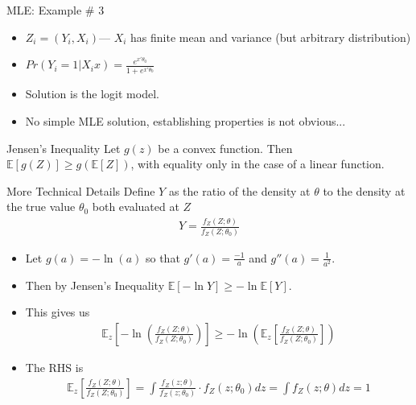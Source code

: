 \documentclass[aspectratio=169]{beamer}
\begin{document}
\begin{frame}{MLE: Example \# 3}
\begin{itemize}
\item $Z_i = (Y_i, X_i)$---   $X_i$ has finite mean and variance (but arbitrary distribution)
\item $Pr(Y_i=1 | X_i  x) =  \frac{e^{x' \theta_0}}{1+ e^{x'\theta_0}}$
\item Solution is the \alert{logit} model.
\item No simple MLE solution, establishing properties is not obvious...
\end{itemize}
\end{frame}

\begin{frame}{Jensen's Inequality}
Let $g(z)$ be a convex function. Then $\mathbb { E }[g(Z)] \geq g(\mathbb { E }[Z])$, with equality only in the case of a linear function.
\end{frame}

\begin{frame}{More Technical Details}
Define $Y$ as the ratio of the density at $\theta$ to the density at the true value $\theta_0$ both evaluated at $Z$
\begin{align*}
Y = \frac{f_Z(Z;\theta)}{f_Z(Z;\theta_0)}
\end{align*}
\begin{itemize}
\item Let $g(a) = -\ln(a)$ so that $g'(a) = \frac{-1}{a}$ and $g''(a) =\frac{1}{a^2}$.
\item Then by \alert{Jensen's Inequality} $\mathbb{E}[- \ln Y] \geq - \ln \mathbb{E}[Y]$.
\item This gives us
\begin{align*}
\mathbb { E }_z \left[ - \ln \left( \frac { f _ { Z } ( Z ; \theta ) } { f _ { Z } \left( Z ; \theta _ { 0 } \right) } \right) \right] \geq - \ln \left( \mathbb { E }_z \left[ \frac { f _ { Z } ( Z ; \theta ) } { f _ { Z } \left( Z ; \theta _ { 0 } \right) } \right] \right)
\end{align*}
\item The RHS is
\begin{align*}
\mathbb { E }_z \left[ \frac { f _ { Z } ( Z ; \theta ) } { f _ { Z } \left( Z ; \theta _ { 0 } \right) } \right] = \int \frac { f _ { Z } ( z ; \theta ) } { f _ { Z } \left( z ; \theta _ { 0 } \right) } \cdot f _ { Z } \left( z ; \theta _ { 0 } \right) d z = \int f _ { Z } ( z ; \theta ) d z = 1
\end{align*}
\end{itemize}
\end{frame}
\end{document}

